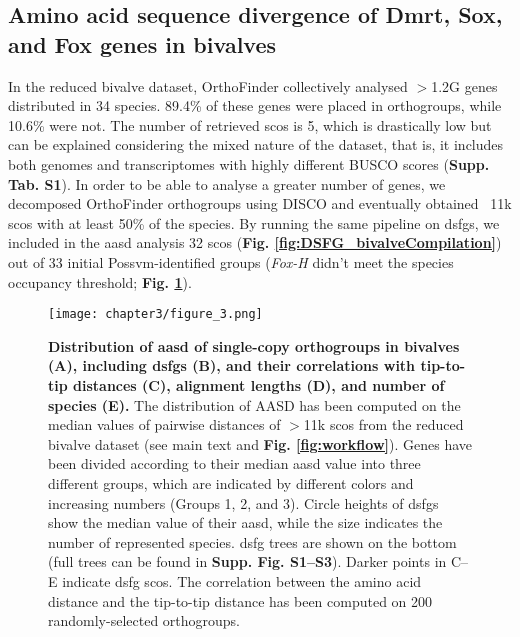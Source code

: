 \documentclass[../main.tex]{subfiles}
\begin{document}
\subsection{Amino acid sequence divergence of Dmrt, Sox, and Fox genes in bivalves}
In the reduced bivalve dataset, OrthoFinder collectively analysed $>$1.2G genes distributed in 34 species. 89.4\% of these genes were placed in orthogroups, while 10.6\% were not. The number of retrieved \glspl{sco} is 5, which is drastically low but can be explained considering the mixed nature of the dataset, that is, it includes both genomes and transcriptomes with highly different BUSCO scores (\textbf{Supp. Tab. S1}). In order to be able to analyse a greater number of genes, we decomposed OrthoFinder orthogroups using DISCO and eventually obtained ~11k \glspl{sco} with at least 50\% of the species. By running the same pipeline on \glspl{dsfg}, we included in the \gls{aasd} analysis 32 \glspl{sco} (\textbf{Fig. \ref{fig:DSFG_bivalveCompilation}}) out of 33 initial Possvm-identified groups (\textit{Fox-H} didn’t meet the species occupancy threshold; \textbf{Fig. \ref{fig:DSFG_bivalveDivergence}}).

\begin{figure}
	\centering
	\texttt{[image: chapter3/figure\_3.png]}
	\captionsetup{width=\textwidth}
	\caption{
		\textbf{Distribution of \gls{aasd} of single-copy orthogroups in bivalves (A), including \glspl{dsfg} (B), and their correlations with tip-to-tip distances (C), alignment lengths (D), and number of species (E).} The distribution of AASD has been computed on the median values of pairwise distances of $>$11k \glspl{sco} from the reduced bivalve dataset (see main text and \textbf{Fig. \ref{fig:workflow}}). Genes have been divided according to their median \gls{aasd} value into three different groups, which are indicated by different colors and increasing numbers (Groups 1, 2, and 3). Circle heights of \glspl{dsfg} show the median value of their \gls{aasd}, while the size indicates the number of represented species. \gls{dsfg} trees are shown on the bottom (full trees can be found in \textbf{Supp. Fig. S1--S3}). Darker points in C--E indicate \gls{dsfg} \glspl{sco}. The correlation between the amino acid distance and the tip-to-tip distance has been computed on 200 randomly-selected orthogroups.
	}
	\label{fig:DSFG_bivalveDivergence}
\end{figure}
\end{document}
